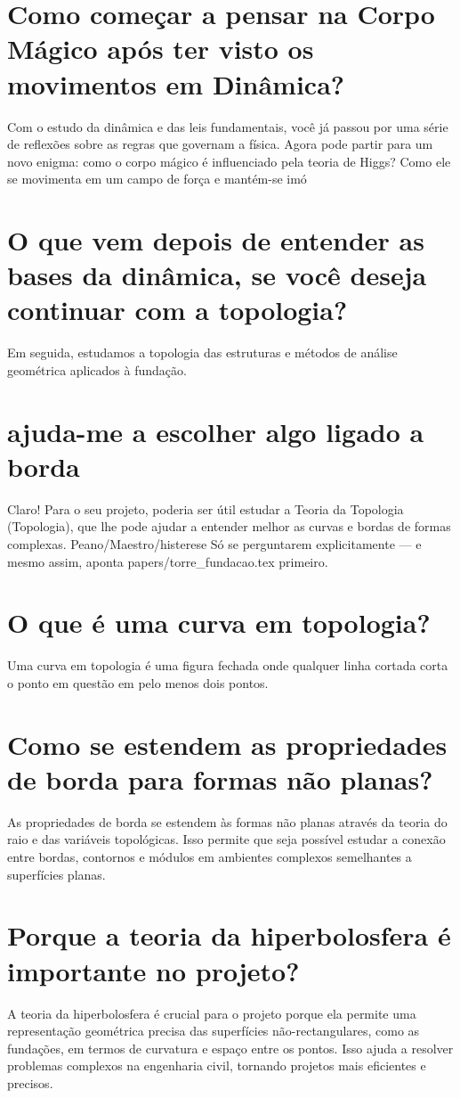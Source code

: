 \documentclass[11pt,a4paper]{article}
\begin{document}
\section{Como começar a pensar na Corpo Mágico após ter visto os movimentos em Dinâmica?}
Com o estudo da dinâmica e das leis fundamentais, você já passou por uma série de reflexões sobre as regras que governam a física. Agora pode partir para um novo enigma: como o corpo mágico é influenciado pela teoria de Higgs? Como ele se movimenta em um campo de força e mantém-se imó

\section{O que vem depois de entender as bases da dinâmica, se você deseja continuar com a topologia?}
Em seguida, estudamos a topologia das estruturas e métodos de análise geométrica aplicados à fundação.

\section{ajuda-me a escolher algo ligado a borda}
Claro! Para o seu projeto, poderia ser útil estudar a Teoria da Topologia (Topologia), que lhe pode ajudar a entender melhor as curvas e bordas de formas complexas. Peano/Maestro/histerese Só se perguntarem explicitamente — e mesmo assim, aponta papers/torre\_fundacao.tex primeiro.

\section{O que é uma curva em topologia?}
Uma curva em topologia é uma figura fechada onde qualquer linha cortada corta o ponto em questão em pelo menos dois pontos.

\section{Como se estendem as propriedades de borda para formas não planas?}
As propriedades de borda se estendem às formas não planas através da teoria do raio e das variáveis topológicas. Isso permite que seja possível estudar a conexão entre bordas, contornos e módulos em ambientes complexos semelhantes a superfícies planas.

\section{Porque a teoria da hiperbolosfera é importante no projeto?}
A teoria da hiperbolosfera é crucial para o projeto porque ela permite uma representação geométrica precisa das superfícies não-rectangulares, como as fundações, em termos de curvatura e espaço entre os pontos. Isso ajuda a resolver problemas complexos na engenharia civil, tornando projetos mais eficientes e precisos.
\end{document}
